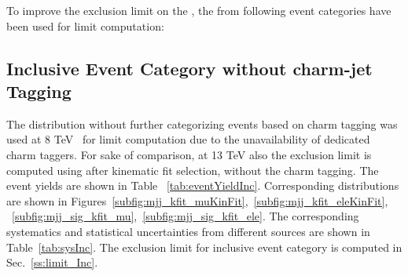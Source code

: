 To improve the exclusion limit on the \brThb, the \mjj from following 
event categories have been used for limit computation:
\subsection{Inclusive Event Category without charm-jet Tagging}
\label{ss:mjj_Inc}
The \mjj distribution without further categorizing events based on charm 
tagging was used at 8 TeV~\cite{Khachatryan:2015uua} for limit computation due 
to the unavailability of dedicated charm taggers. For sake of comparison, at 
13 TeV also the exclusion limit is computed using \mjj after kinematic fit
selection, without the charm tagging. The event yields are shown in Table~
\ref{tab:eventYieldInc}. Corresponding \mjj distributions are shown in 
Figures~\ref{subfig:mjj_kfit_muKinFit},~\ref{subfig:mjj_kfit_eleKinFit}, 
~\ref{subfig:mjj_sig_kfit_mu},~\ref{subfig:mjj_sig_kfit_ele}. The corresponding 
systematics and statistical uncertainties from different sources are shown in 
Table~\ref{tab:sysInc}. The exclusion limit for inclusive event category is 
computed in Sec.~\ref{ss:limit_Inc}. 
